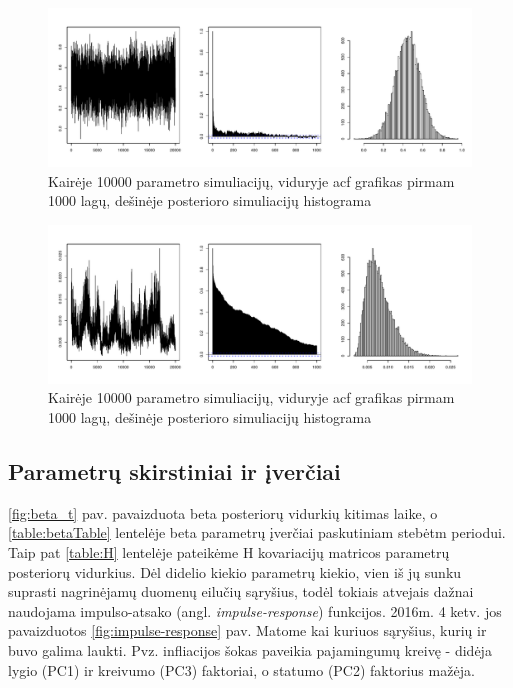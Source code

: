 \documentclass[12pt,lithuanian,]{article}
\begin{document}
\begin{figure}[htbp]
\centering
\includegraphics{bayesFAVAR_TVP_files/figure-latex/convergencePlot-1.pdf}
\caption{\label{fig:convergence}Kairėje 10000 parametro simuliacijų,
viduryje acf grafikas pirmam 1000 lagų, dešinėje posterioro simuliacijų
histograma}
\end{figure}

\begin{figure}[htbp]
\centering
\includegraphics{bayesFAVAR_TVP_files/figure-latex/convergencePlot2-1.pdf}
\caption{\label{fig:convergence2}Kairėje 10000 parametro simuliacijų,
viduryje acf grafikas pirmam 1000 lagų, dešinėje posterioro simuliacijų
histograma}
\end{figure}

\subsection{Parametrų skirstiniai ir
įverčiai}\label{parametru-skirstiniai-ir-iverciai}

\ref{fig:beta_t} pav. pavaizduota beta posteriorų vidurkių kitimas
laike, o \ref{table:betaTable} lentelėje beta parametrų įverčiai
paskutiniam stebėtm periodui. Taip pat \ref{table:H} lentelėje pateikėme
H kovariacijų matricos parametrų posteriorų vidurkius. Dėl didelio
kiekio parametrų kiekio, vien iš jų sunku suprasti nagrinėjamų duomenų
eilučių sąryšius, todėl tokiais atvejais dažnai naudojama impulso-atsako
(angl. \emph{impulse-response}) funkcijos. 2016m. 4 ketv. jos
pavaizduotos \ref{fig:impulse-response} pav. Matome kai kuriuos
sąryšius, kurių ir buvo galima laukti. Pvz. infliacijos šokas paveikia
pajamingumų kreivę - didėja lygio (PC1) ir kreivumo (PC3) faktoriai, o
statumo (PC2) faktorius mažėja.
\end{document}
